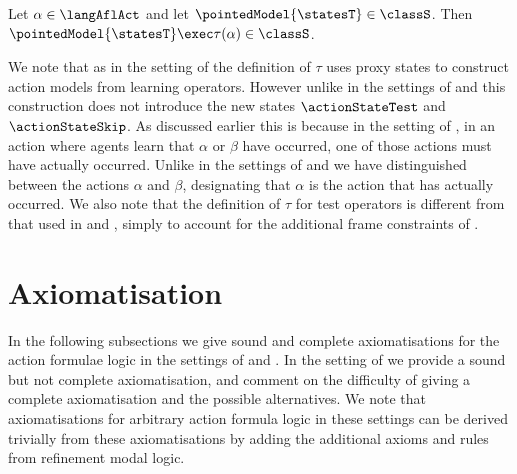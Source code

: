 \documentclass[twoside]{aiml14}
\begin{document}
  \begin{lemma}\label{afl-s-exec}
      Let $\alpha \in \langAflAct$ and 
      let $\pointedModel{\statesT} \in \classS$.
      Then $\pointedModel{\statesT} \exec \tau(\alpha) \in \classS$.
  \end{lemma}

  We note that as in the setting of \classKFF{} the definition of $\tau$ uses
  proxy states to construct action models from learning operators. However
  unlike in the settings of \classK{} and \classKFF{} this construction does
  not introduce the new states $\actionStateTest$ and $\actionStateSkip$. As
  discussed earlier this is because in the setting of \classS{}, in an action
  where agents learn that $\alpha$ or $\beta$ have occurred, one of those
  actions must have actually occurred. Unlike in the settings of \classK{} and
  \classKFF{} we have distinguished between the actions $\alpha$ and $\beta$,
  designating that $\alpha$ is the action that has actually occurred. We also
  note that the definition of $\tau$ for test operators is different from that
  used in \classK{} and \classKFF{}, simply to account for the additional frame
  constraints of \classS{}.

  \section{Axiomatisation}\label{axiomatisation}

  In the following subsections we give sound and complete axiomatisations for
  the action formulae logic in the settings of \classK{} and \classKFF{}. In
  the setting of \classS{} we provide a sound but not complete axiomatisation,
  and comment on the difficulty of giving a complete axiomatisation and the
  possible alternatives.
  We note that axiomatisations for arbitrary action formula logic in these
  settings can be derived trivially from these axiomatisations by adding the
  additional axioms and rules from refinement modal logic.

  \subsection{\classK{}}
\end{document}

